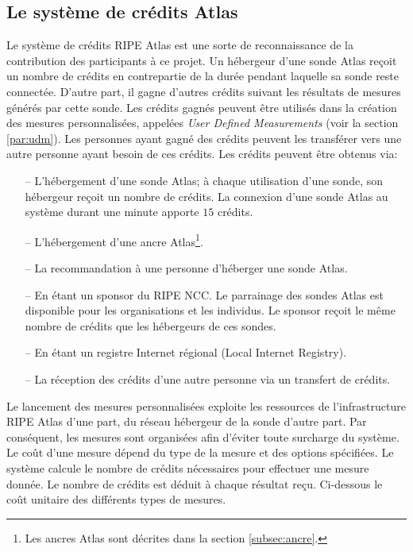 \subsection{Le système de crédits Atlas} \label{credits-atlas}

Le système de crédits RIPE Atlas est une sorte de reconnaissance de la contribution des participants à ce projet. Un hébergeur d'une sonde  Atlas reçoit un nombre de crédits en contrepartie de la durée pendant laquelle sa sonde reste connectée. D'autre part, il gagne d'autres crédits suivant les résultats de mesures générés par cette sonde. Les crédits gagnés peuvent être utilisés dans la création des mesures personnalisées, appelées  \textit{User Defined Measurements} (voir la section \ref{par:udm}). Les personnes ayant gagné des crédits peuvent les transférer vers une autre personne ayant besoin de ces crédits. Les crédits peuvent être obtenus via:
\begin{itemize}
	\item[--] L'hébergement d'une sonde Atlas; à chaque utilisation d'une sonde, son hébergeur reçoit un nombre de crédits.  La connexion d'une sonde  Atlas au système durant une minute apporte $15$ crédits.
	\item[--] L'hébergement d'une ancre  Atlas\footnote{Les ancres Atlas sont décrites dans  la section \ref{subsec:ancre}.}.
	\item[--] La recommandation à une personne d'héberger une sonde  Atlas.
	\item[--] En étant un sponsor du RIPE NCC. Le parrainage des sondes Atlas est disponible pour les organisations et les individus.  Le sponsor reçoit le même nombre de crédits que les hébergeurs de ces sondes.
	\item[--] En étant  un  registre Internet régional (Local Internet Registry).
	\item[--] La réception des crédits d'une autre personne via un transfert de crédits.
\end{itemize}

Le lancement des mesures personnalisées exploite les ressources de l'infrastructure RIPE Atlas d'une part,  du réseau hébergeur de la sonde d'autre part. Par conséquent, les mesures sont organisées afin d'éviter toute surcharge du système. Le coût d'une  mesure dépend du type de la mesure et des options spécifiées. Le système calcule le nombre de crédits nécessaires pour effectuer une mesure donnée. Le nombre de crédits est déduit à chaque résultat reçu.  Ci-dessous le coût unitaire des différents types de mesures.

